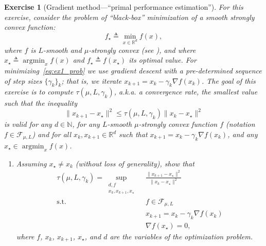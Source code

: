 \documentclass[11pt,a4paper]{article}
\DeclareMathOperator*{\argmin}{argmin}
\newtheorem{exercise}{Exercise}
\begin{document}
	\begin{exercise}[Gradient method---``primal performance estimation'']\label{ex1} For this exercise, consider the problem of ``black-box'' minimization of a smooth strongly convex function:
	\begin{equation}\label{eq:ex1_prob}
	f_\star \triangleq \min_{x\in\mathbb{R}^d} f(x),
	\end{equation}
	where $f$ is $L$-smooth and $\mu$-strongly convex (see ), and where $x_\star\triangleq \argmin_{x} f(x)$ and $f_\star\triangleq f(x_\star)$ its optimal value. For minimizing~\eqref{eq:ex1_prob} we use gradient descent with a pre-determined sequence of step sizes $\{\gamma_k\}_k$; that is, we iterate $x_{k+1}=x_k-\gamma_k \nabla f(x_k)$.
	The goal of this exercise is to compute $\tau(\mu,L,\gamma_k)$, a.k.a.\! a convergence rate, the smallest value such that the inequality
	\begin{equation}\label{ex1:eq:distance}
	 \|x_{k+1}-x_\star\|^2 \leqslant \tau(\mu,L,\gamma_k) \|x_k-x_\star\|^2
	\end{equation}
	is valid for any $d\in\mathbb{N}$, for any $L$-smooth $\mu$-strongly convex function $f$ (notation $f\in\mathcal{F}_{\mu,L}$) and for all $x_k,x_{k+1}\in\mathbb{R}^d$ such that $x_{k+1}=x_k-\gamma_k \nabla f(x_k)$, and any $x_\star\in\argmin_x f(x)$. 
	\begin{enumerate}
	\item Assuming $x_\star\neq x_k$ (without loss of generality), show that 
	\begin{equation}\label{ex1:eq:base_pep1}
	\begin{aligned}
		\tau(\mu,L,\gamma_k)= \sup_{\substack{d,f\\x_k,x_{k+1},x_\star}} \ &\frac{\|x_{k+1}-x_\star\|^2}{\|x_k-x_\star\|^2}\\
		\text{s.t. } & f\in\mathcal{F}_{\mu,L} \\
		&x_{k+1}=x_k-\gamma_k  \nabla f(x_k)\\
		&\nabla f(x_\star)=0,
		\end{aligned}
	\end{equation} where $f$, $x_k$, $x_{k+1}$, $x_\star$, and $d$ are the variables of the optimization problem.
		

\end{enumerate}
\end{exercise}
\end{document}

